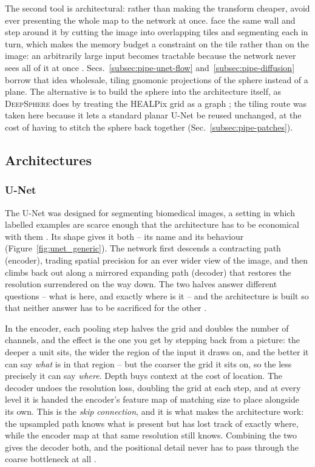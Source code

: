 \documentclass{report}
\begin{document}
The second tool is architectural: rather than making the transform cheaper, avoid ever presenting the whole map to the network at once.
\citeauthor{ronneberger_u-net_2015} face the same wall and step around it by cutting the image into overlapping tiles and segmenting each in turn, which makes the memory budget a constraint on the tile rather than on the image: an arbitrarily large input becomes tractable because the network never sees all of it at once \cite{ronneberger_u-net_2015}. Secs.~\ref{subsec:pipe-unet-flow} and~\ref{subsec:pipe-diffusion} borrow that idea wholesale, tiling gnomonic projections of the sphere instead of a plane. The alternative is to build the sphere into the architecture itself, as \textsc{DeepSphere} does by treating the HEALPix grid as a graph \cite{perraudin_deepsphere_2019, defferrard_deepsphere_2020}; the tiling route was taken here because it lets a standard planar U-Net be reused unchanged, at the cost of having to stitch the sphere back together (Sec.~\ref{subsec:pipe-patches}).

\subsection{Architectures}
\label{subsec:architectures}

\subsubsection{U-Net}
\label{sssec:unet-arch}

The U-Net was designed for segmenting biomedical images, a setting in which labelled examples are scarce enough that the architecture has to be economical with them \cite{ronneberger_u-net_2015}. Its shape gives it both -- its name and its behaviour (Figure~\ref{fig:unet_generic}). The network first descends a contracting path (encoder), trading spatial precision for an ever wider view of the image, and then climbs back out along a mirrored expanding path (decoder) that restores the resolution surrendered on the way down. The two halves answer different questions -- what is here, and exactly where is it -- and the architecture is built so that neither answer has to be sacrificed for the other \cite{ronneberger_u-net_2015}.

In the encoder, each pooling step halves the grid and doubles the number of channels, and the effect is the one you get by stepping back from a picture: the deeper a unit sits, the wider the region of the input it draws on, and the better it can say \emph{what} is in that region -- but the coarser the grid it sits on, so the less precisely it can say \emph{where}. Depth buys context at the cost of location. The decoder undoes the resolution loss, doubling the grid at each step, and at every level it is handed the encoder's feature map of matching size to place alongside its own. This is the \emph{skip connection}, and it is what makes the architecture work: the upsampled path knows what is present but has lost track of exactly where, while the encoder map at that same resolution still knows. Combining the two gives the decoder both, and the positional detail never has to pass through the coarse bottleneck at all \cite{ronneberger_u-net_2015}.
\end{document}

